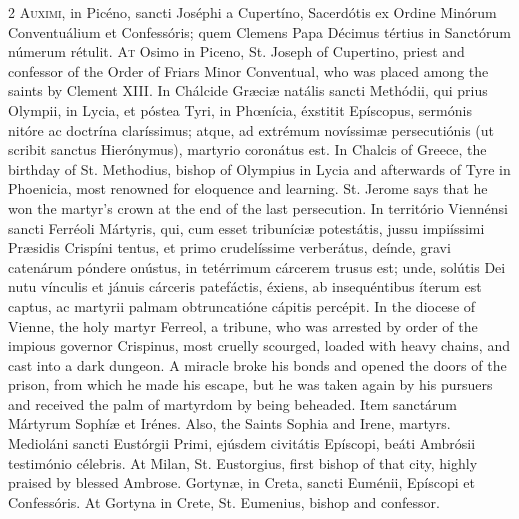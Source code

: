 \begin{paracol}{2}
\lettrine[lines=2]{A}{uximi,} in Picéno, sancti Joséphi a Cupertíno, Sacerdótis ex Ordine Minórum Conventuálium et 
 Confessóris; quem Clemens Papa Décimus tértius in Sanctórum númerum rétulit.
\switchcolumn
{}
\lettrine[lines=2]{A}{t} Osimo in Piceno, St. Joseph of 
 Cupertino, priest and confessor of the Order of Friars Minor Conventual, who was placed 
 among the saints by Clement XIII.
\switchcolumn*
{}
In Chálcide Græciæ 
 natális sancti Methódii, qui prius Olympii, in Lycia, et póstea Tyri, in 
 Phœnícia, éxstitit Epíscopus, sermónis nitóre ac doctrína claríssimus; atque, 
 ad extrémum novíssimæ persecutiónis (ut scribit sanctus Hierónymus), 
 martyrio coronátus est.
\switchcolumn
{}
In Chalcis of Greece, the birthday 
 of St. Methodius, bishop of Olympius in Lycia and afterwards of Tyre in 
 Phoenicia, most renowned for eloquence and learning. St. Jerome says 
 that he won the martyr's crown at the end of the last persecution.
\switchcolumn*
{}
In território Viennénsi 
 sancti Ferréoli Mártyris, qui, cum esset tribuníciæ potestátis, jussu 
 impiíssimi Præsidis Crispíni tentus, et primo crudelíssime verberátus, 
 deínde, gravi catenárum póndere onústus, in tetérrimum cárcerem trusus est; 
 unde, solútis Dei nutu vínculis et jánuis cárceris patefáctis, éxiens, ab 
 insequéntibus íterum est captus, ac martyrii palmam obtruncatióne cápitis 
 percépit.
\switchcolumn
{}
In the diocese of Vienne, the holy 
 martyr Ferreol, a tribune, who was arrested by order of the impious governor 
 Crispinus, most cruelly scourged, loaded with heavy chains, and cast into a 
 dark dungeon. A miracle broke his bonds and opened the doors of the 
 prison, from which he made his escape, but he was taken again by his 
 pursuers and received the palm of martyrdom by being beheaded.
\switchcolumn*
{}
Item sanctárum Mártyrum 
 Sophíæ et Irénes.
\switchcolumn
{}
Also, the Saints Sophia and Irene, 
 martyrs.
\switchcolumn*
{}
Medioláni sancti 
 Eustórgii Primi, ejúsdem civitátis Epíscopi, beáti Ambrósii testimónio 
 célebris.
\switchcolumn
{}
At Milan, St. Eustorgius, first 
 bishop of that city, highly praised by blessed Ambrose.
\switchcolumn*
{}
Gortynæ, in Creta, 
 sancti Euménii, Epíscopi et Confessóris.
\switchcolumn
{}
At Gortyna in Crete, St. Eumenius, 
 bishop and confessor.
\switchcolumn*
{}
\end{paracol}


